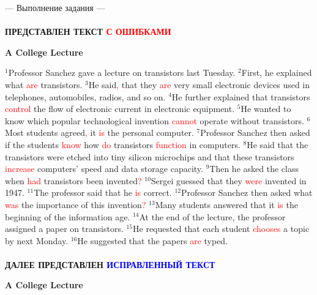 \documentclass[main.tex]{subfiles}
\begin{document}
--- Выполнение задания ---
\\

\\

\textbf{ПРЕДСТАВЛЕН ТЕКСТ \textcolor{red}{С ОШИБКАМИ}}

\centerline{\textbf{A College Lecture}}

$^1$Professor Sanchez gave a lecture on transistors last Tuesday.
$^2$First, he explained what \textcolor{red}{are} transistors.
$^3$He said\textcolor{red}{,} that they \textcolor{red}{are} very small electronic devices used in telephones, automobiles, radios, and so on.
$^4$He further explained that transistors \textcolor{red}{control} the flow of electronic current in electronic equipment.
$^5$He wanted to know which popular technological invention \textcolor{red}{cannot} operate without transistors.
$^6$Most students agreed\textcolor{red}{,} it \textcolor{red}{is} the personal computer.
$^7$Professor Sanchez then asked if the students \textcolor{red}{know} how \textcolor{red}{do} transistors \textcolor{red}{function} in computers.
$^8$He said that the transistors were etched into tiny silicon microchips and that these transistors \textcolor{red}{increase} computers' speed and data storage capacity.
$^9$Then he asked the class when \textcolor{red}{had} transistors been invented\textcolor{red}{?}
$^{10}$Sergei guessed that they \textcolor{red}{were} invented in 1947.
$^{11}$The professor said that he \textcolor{red}{is} correct.
$^{12}$Professor Sanchez then asked what \textcolor{red}{was} the importance of this invention\textcolor{red}{?}
$^{13}$Many students answered that it \textcolor{red}{is} the beginning of the information age.
$^{14}$At the end of the lecture, the professor assigned a paper on transistors.
$^{15}$He requested that each student \textcolor{red}{chooses} a topic by next Monday.
$^{16}$He suggested that the papers \textcolor{red}{are} typed.
\\

\\

\textbf{ДАЛЕЕ ПРЕДСТАВЛЕН \textcolor{blue}{ИСПРАВЛЕННЫЙ ТЕКСТ}}

\centerline{\textbf{A College Lecture}}
\end{document}
